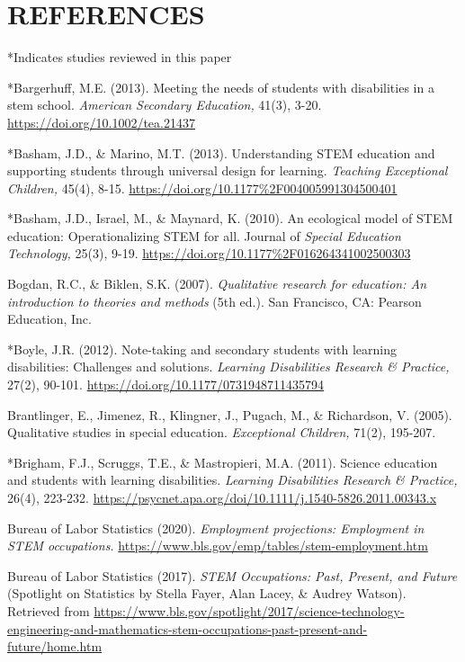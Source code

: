 \documentclass[11.5pt]{sig-alternate}
\begin{document}
\section*{REFERENCES}\par 

\leftskip 0.25in
\parindent -0.25in 

*Indicates studies reviewed in this paper 

*Bargerhuff, M.E. (2013). Meeting the needs of students with disabilities in a stem school. \textit{American Secondary Education,} 41(3), 3-20.  \url{https://doi.org/10.1002/tea.21437}

*Basham, J.D., \& Marino, M.T. (2013). Understanding STEM education and supporting students through universal design for learning. \textit{Teaching Exceptional Children,} 45(4), 8-15. \url{https://doi.org/10.1177\%2F004005991304500401}

*Basham, J.D., Israel, M., \& Maynard, K. (2010). An ecological model of STEM education: Operationalizing STEM for all. Journal of \textit{Special Education Technology,} 25(3), 9-19. \url{https://doi.org/10.1177\%2F016264341002500303}

Bogdan, R.C., \& Biklen, S.K. (2007). \textit{Qualitative research for education: An introduction to theories and methods} (5th ed.). San Francisco, CA: Pearson Education, Inc. 

*Boyle, J.R. (2012). Note-taking and secondary students with learning disabilities: Challenges and solutions. \textit{Learning Disabilities Research \& Practice,} 27(2), 90-101. \url{https://doi.org/10.1177/0731948711435794}

Brantlinger, E., Jimenez, R., Klingner, J., Pugach, M., \& Richardson, V. (2005). Qualitative studies in special education. \textit{Exceptional Children,} 71(2), 195-207.

*Brigham, F.J., Scruggs, T.E., \& Mastropieri, M.A. (2011). Science education and students with learning disabilities. \textit{Learning Disabilities Research \& Practice,} 26(4), 223-232. \url{https://psycnet.apa.org/doi/10.1111/j.1540-5826.2011.00343.x}

Bureau of Labor Statistics (2020). \textit{Employment projections: Employment in STEM occupations.} \url{https://www.bls.gov/emp/tables/stem-employment.htm}

Bureau of Labor Statistics (2017). \textit{STEM Occupations: Past, Present, and Future} (Spotlight on Statistics by Stella Fayer, Alan Lacey, \& Audrey Watson). Retrieved from \url{https://www.bls.gov/spotlight/2017/science-technology-engineering-and-mathematics-stem-occupations-past-present-and-future/home.htm}
\end{document}
